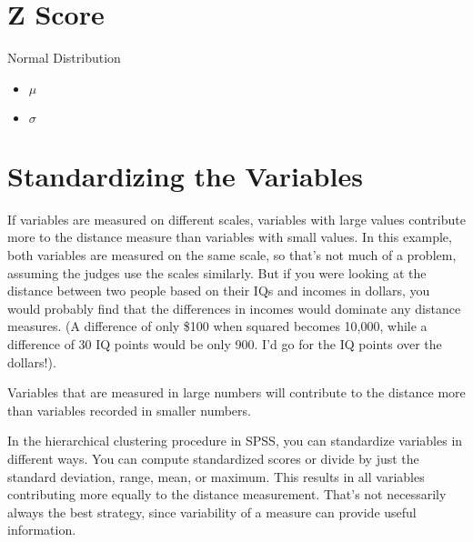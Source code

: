 \documentclass[]{report}
\begin{document}
\section{Z Score}

Normal Distribution
\begin{itemize}
\item $\mu$
\item $\sigma$
\end{itemize}


\section{Standardizing the Variables}
If variables are measured on different scales, variables with large values contribute
more to the distance measure than variables with small values. In this example, both
variables are measured on the same scale, so that’s not much of a problem, assuming
the judges use the scales similarly. But if you were looking at the distance between two
people based on their IQs and incomes in dollars, you would probably find that the
differences in incomes would dominate any distance measures. (A difference of only
\$100 when squared becomes 10,000, while a difference of 30 IQ points would be only
900. I’d go for the IQ points over the dollars!).

Variables that are measured in large numbers will contribute to the distance more than variables recorded in smaller
numbers.

In the hierarchical clustering procedure in SPSS, you can standardize variables in
different ways. You can compute standardized scores or divide by just the standard
deviation, range, mean, or maximum. This results in all variables contributing more
equally to the distance measurement. That’s not necessarily always the best strategy,
since variability of a measure can provide useful information. 
\end{document}
